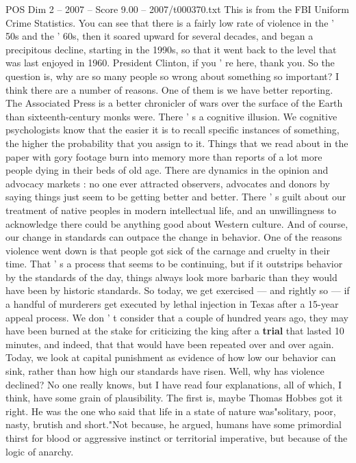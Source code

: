 \begin{textsample}{POS Dim 2 – 2007 – Score 9.00 – 2007/t000370.txt}
This is from the FBI Uniform Crime Statistics.
You can see that there is a fairly low rate of violence in the ' 50s and the ' 60s, then it soared upward for several decades, and began a precipitous decline, starting in the 1990s, so that it went back to the level that was last enjoyed in 1960.
President Clinton, if you ' re here, thank you.
So the question is, why are so many people so wrong about something so important?
I think there are a number of reasons.
One of them is we have better reporting.
The Associated Press is a better chronicler of wars over the surface of the Earth than sixteenth-century monks were.
There ' s a cognitive illusion.
We cognitive psychologists know that the easier it is to recall specific instances of something, the higher the probability that you assign to it.
Things that we read about in the paper with gory footage burn into memory more than reports of a lot more people dying in their beds of old age.
There are dynamics in the opinion and advocacy markets : no one ever attracted observers, advocates and donors by saying things just seem to be getting better and better.
There ' s guilt about our treatment of native peoples in modern intellectual life, and an unwillingness to acknowledge there could be anything good about Western culture.
And of course, our change in standards can outpace the change in behavior.
One of the reasons violence went down is that people got sick of the carnage and cruelty in their time.
That ' s a process that seems to be continuing, but if it outstrips behavior by the standards of the day, things always look more barbaric than they would have been by historic standards.
So today, we get exercised — and rightly so — if a handful of murderers get executed by lethal injection in Texas after a 15-year appeal process.
We don ' t consider that a couple of hundred years ago, they may have been burned at the stake for criticizing the king after a \textbf{trial} that lasted 10 minutes, and indeed, that that would have been repeated over and over again.
Today, we look at capital punishment as evidence of how low our behavior can sink, rather than how high our standards have risen.
Well, why has violence declined?
No one really knows, but I have read four explanations, all of which, I think, have some grain of plausibility.
The first is, maybe Thomas Hobbes got it right.
He was the one who said that life in a state of nature was"solitary, poor, nasty, brutish and short."Not because, he argued, humans have some primordial thirst for blood or aggressive instinct or territorial imperative, but because of the logic of anarchy.

\end{textsample}
